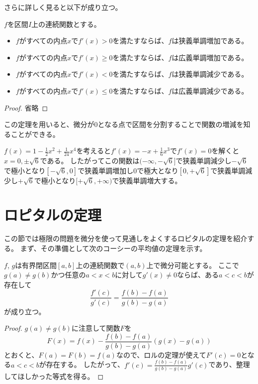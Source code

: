 さらに詳しく見ると以下が成り立つ。

\begin{theorem}
\label{t_diff_monotone}
$f$を区間$I$上の連続関数とする。
\begin{itemize}
\item
$f$がすべての内点$x$で$f'(x) > 0$を満たすならば、$f$は狭義単調増加である。
\item
$f$がすべての内点$x$で$f'(x) \ge 0$を満たすならば、$f$は広義単調増加である。
\item
$f$がすべての内点$x$で$f'(x) < 0$を満たすならば、$f$は狭義単調減少である。
\item
$f$がすべての内点$x$で$f'(x) \le 0$を満たすならば、$f$は広義単調減少である。
\end{itemize}
\end{theorem}

\begin{proof}
省略
\end{proof}

この定理を用いると、微分が$0$となる点で区間を分割することで関数の増減を知ることができる。

\begin{example}
$f(x) = 1-\frac{1}{2}x^2+\frac{1}{24}x^4$を考えると$f'(x) = -x+\frac{1}{6}x^3$で$f'(x) = 0$を解くと$x = 0, \pm\sqrt{6}$である。
したがってこの関数は$(-\infty, -\sqrt{6}]$で狭義単調減少し$-\sqrt{6}$で極小となり$[-\sqrt{6}, 0]$で狭義単調増加し$0$で極大となり$[0, +\sqrt{6}]$で狭義単調減少し$+\sqrt{6}$で極小となり$[+\sqrt{6}, +\infty)$で狭義単調増大する。
\end{example}

\section{ロピタルの定理}

この節では極限の問題を微分を使って見通しをよくするロピタルの定理を紹介する。
まず、その準備として次のコーシーの平均値の定理を示す。

\begin{theorem}[コーシーの平均値の定理]
$f$, $g$は有界閉区間$[a, b]$上の連続関数で$(a, b)$上で微分可能とする。
ここで$g(a) \ne g(b)$かつ任意の$a < x < b$に対して$g'(x) \ne 0$ならば、ある$a < c < b$が存在して
$$
\frac{f'(c)}{g'(c)} = \frac{f(b)-f(a)}{g(b)-g(a)}
$$
が成り立つ。
\end{theorem}

\begin{proof}
$g(a) \ne g(b)$に注意して関数$F$を
$$
F(x) = f(x)-\frac{f(b)-f(a)}{g(b)-g(a)}(g(x)-g(a))
$$
とおくと、$F(a) = F(b) = f(a)$なので、ロルの定理が使えて$F'(c) = 0$となる$a < c < b$が存在する。
したがって、$f'(c) = \frac{f(b)-f(a)}{g(b)-g(a)}g'(c)$であり、整理してほしかった等式を得る。
\end{proof}

